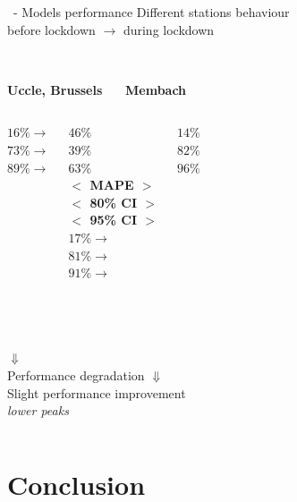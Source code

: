 \documentclass{beamer}
\begin{document}
\begin{frame}{\subsecname~- Models performance}
	\centering Different stations behaviour\\before lockdown $\rightarrow$ during lockdown\\~\\
	\begin{columns}[T]
		\centering
		\textbf{Uccle, Brussels}~~~
		\centering
		\centering
		\textbf{Membach}
	\end{columns}
	\begin{columns}[T]
		\raggedleft
		${16\%} \rightarrow$\\
		${73\%} \rightarrow$\\
		${89\%} \rightarrow$\\
		\raggedright
		$46\%$\\
		$39\%$\\
		$63\%$\\
		\centering
		\textbf{$<$ MAPE $>$}\\\textbf{$<$ 80\% CI $>$}\\\textbf{$<$ 95\% CI $>$}\\
		\raggedleft
		$17\% \rightarrow$\\
		$81\% \rightarrow$\\
		$91\% \rightarrow$\\
		\raggedright
		${14\%}$\\
		${82\%}$\\
		${96\%}$\\
	\end{columns}~\\
	\begin{columns}[T]
		\centering
		$\Downarrow$\\
		Performance degradation
		\centering
		$\Downarrow$\\
		Slight performance improvement\\
		\textit{lower peaks}
	\end{columns}
\end{frame}


\section{Conclusion}
\end{document}
